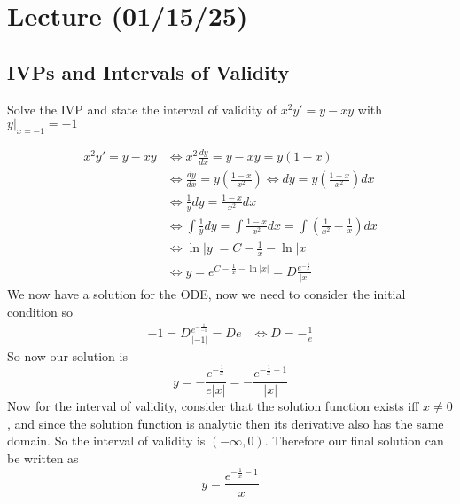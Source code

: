 \documentclass[notes]{subfiles}
\begin{document}
\setcounter{section}{2}
\section{Lecture (01/15/25)}

\subsection{IVPs and Intervals of Validity}
\begin{exercise}
    Solve the IVP and state the interval of validity of $x^2 y' = y - xy$ with $y|_{x = -1} = -1$
\end{exercise}
\begin{solution}
    \begin{align*}
        x^2 y' = y - xy
        &\iff x^2\frac{dy}{dx} = y - xy = y(1 - x) \\
        &\iff \frac{dy}{dx} = y\left(\frac{1 - x}{x^2}\right)
        \iff dy = y\left(\frac{1 - x}{x^2}\right)dx \\
        &\iff \frac{1}{y}dy = \frac{1 - x}{x^2}dx \\
        &\iff \int \frac{1}{y}dy = \int \frac{1 - x}{x^2}dx = \int \left(\frac{1}{x^2} - \frac{1}{x}\right)dx \\
        &\iff \ln|y| = C - \frac{1}{x} - \ln|x| \\
        &\iff y = e^{C - \frac{1}{x} - \ln|x|} = D\frac{e^{-\frac{1}{x}}}{|x|}
    \end{align*}
    We now have a solution for the ODE, now we need to consider the initial condition so
    \begin{align*}
        -1 = D\frac{e^{-\frac{1}{-1}}}{|-1|} = De &\iff D = -\frac{1}{e}
    \end{align*}
    So now our solution is
    \begin{equation} \label{test_answer_1}
        y = -\frac{e^{-\frac{1}{x}}}{e|x|} = -\frac{e^{-\frac{1}{x} - 1}}{|x|}
    \end{equation}
    Now for the interval of validity, consider that the solution function exists iff $x \neq 0$, and since the solution function is analytic then its derivative also has the same domain. So the interval of validity is $(-\infty, 0)$. Therefore our final solution can be written as
    \begin{equation} \label{test_answer_2}
        y = \frac{e^{-\frac{1}{x} - 1}}{x}
    \end{equation}
\end{solution}
\end{document}
